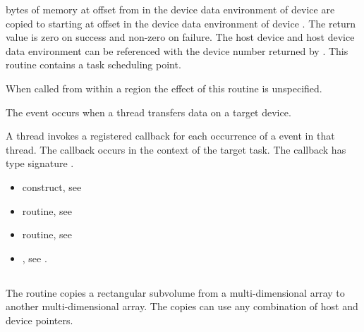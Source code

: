 \begin{ccppspecific}
\effect


 bytes of memory at offset  from  
in the device data environment of device  are
copied to  starting at offset  in the device data
environment of device .
The return value is zero on success and non-zero on failure.  The host device
and host device data environment can be referenced with the device number
returned by . This routine contains a task
scheduling point.

When called from within a  region
the effect of this routine is unspecified.

\events
The  event occurs when a thread transfers data on a target device.

\tools
A thread invokes a registered 
callback for each occurrence of a  event in that thread.
The callback occurs in the context of the target task.  The callback has type signature
.


\crossreferences
\begin{itemize}
\item {} construct, see 

\item {} routine, see

\item {} routine, see 


\item {}, see
.
\end{itemize}


\vspace{-1\baselineskip}
\subsection{}
\label{subsec:omp_target_memcpy_rect}
\summary

The  routine copies a rectangular subvolume from
a multi-dimensional array to another multi-dimensional array. The copies can
use any combination of host and device pointers.


\end{ccppspecific}
